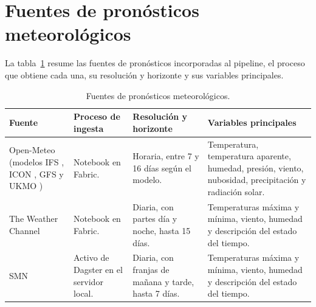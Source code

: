 \section{Fuentes de pronósticos meteorológicos}
\label{sec:apendice_fuentes_pronos}

La tabla~\ref{tab:fuentes_pronosticos} resume las fuentes de pronósticos incorporadas al pipeline, el proceso que obtiene cada una, su resolución y horizonte y sus variables principales.

\begin{table}[htbp]
	\centering
	\caption{Fuentes de pronósticos meteorológicos.}
	\label{tab:fuentes_pronosticos}
	\footnotesize
	\setlength{\tabcolsep}{4pt}
	\renewcommand{\arraystretch}{1.15}
	
	\begin{tabularx}{\textwidth}{
			@{}
			>{\raggedright\arraybackslash\hsize=0.9\hsize}X
			>{\raggedright\arraybackslash\hsize=0.7\hsize}X
			>{\raggedright\arraybackslash\hsize=0.8\hsize}X
			>{\raggedright\arraybackslash\hsize=1.6\hsize}X
			@{}
		}
		\toprule
		
		\textbf{Fuente} &
		\textbf{Proceso de ingesta} &
		\textbf{Resolución y horizonte} &
		\textbf{Variables principales} \\
		
		\midrule
		
		Open-Meteo (modelos IFS \cite{ecmwfIFS}, ICON \cite{zangl2015icon}, GFS \cite{noaaGFS} y UKMO \cite{walters2019ukmo}) &
		Notebook en Fabric. &
		Horaria, entre 7 y 16 días según el modelo. &
		Temperatura, temperatura aparente, humedad, presión, viento, nubosidad, precipitación y radiación solar. \\ \addlinespace
		
		The Weather Channel &
		Notebook en Fabric. &
		Diaria, con partes día y noche, hasta 15 días. &
		Temperaturas máxima y mínima, viento, humedad y descripción del estado del tiempo. \\ \addlinespace
		
		SMN &
		Activo de Dagster en el servidor local. &
		Diaria, con franjas de mañana y tarde, hasta 7 días. &
		Temperaturas máxima y mínima, viento, humedad y descripción del estado del tiempo. \\ 
		
		\bottomrule
	\end{tabularx}
\end{table}

